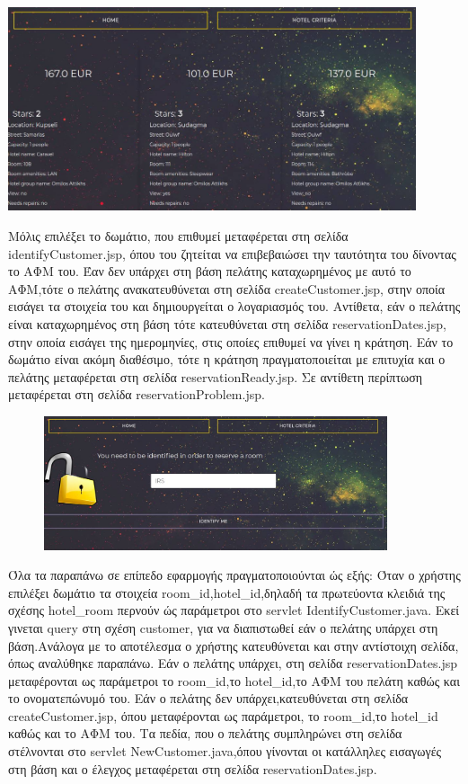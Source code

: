 \documentclass[a4paper,oneside, 11pt]{article}
\begin{document}
\begin{enumerate}
\includegraphics[width=0.9\textwidth]{roomSel.jpg}
\bigbreak


Μόλις επιλέξει το δωμάτιο, που επιθυμεί  μεταφέρεται στη σελίδα identifyCustomer.jsp, όπου του ζητείται να επιβεβαιώσει την ταυτότητα του δίνοντας το ΑΦΜ του. Έαν δεν υπάρχει στη βάση πελάτης καταχωρημένος με αυτό το ΑΦΜ,τότε ο πελάτης ανακατευθύνεται στη σελίδα createCustomer.jsp, στην οποία εισάγει τα στοιχεία του και δημιουργείται ο λογαριασμός του. Αντίθετα, εάν ο πελάτης είναι καταχωρημένος στη βάση τότε κατευθύνεται στη σελίδα reservationDates.jsp, στην οποία εισάγει της ημερομηνίες, στις οποίες επιθυμεί να γίνει η κράτηση. Εάν το δωμάτιο είναι ακόμη διαθέσιμο, τότε η κράτηση πραγματοποιείται με επιτυχία και ο πελάτης μεταφέρεται στη σελίδα reservationReady.jsp. Σε αντίθετη περίπτωση μεταφέρεται στη σελίδα reservationProblem.jsp.
\begin{figure}[h]
\center
\includegraphics[width=0.9\textwidth]{identify.jpg}
\bigbreak
\end{figure}



Όλα τα παραπάνω σε επίπεδο εφαρμογής πραγματοποιούνται ώς εξής: Όταν ο χρήστης επιλέξει δωμάτιο τα στοιχεία room\_id,hotel\_id,δηλαδή τα πρωτεύοντα κλειδιά της σχέσης hotel\_room περνούν ώς παράμετροι στο servlet IdentifyCustomer.java. Εκεί γινεται query στη σχέση customer, για να διαπιστωθεί εάν ο πελάτης υπάρχει στη βάση.Ανάλογα με το αποτέλεσμα ο χρήστης κατευθύνεται και στην αντίστοιχη σελίδα, όπως αναλύθηκε παραπάνω. Εάν ο πελάτης υπάρχει, στη σελίδα reservationDates.jsp μεταφέρονται ως παράμετροι το room\_id,το hotel\_id,το ΑΦΜ του πελάτη καθώς και το ονοματεπώνυμό του. Εάν ο πελάτης δεν υπάρχει,κατευθύνεται στη σελίδα createCustomer.jsp, όπου μεταφέρονται ως παράμετροι, το room\_id,το hotel\_id καθώς και το ΑΦΜ του. Τα πεδία, που ο πελάτης συμπληρώνει στη σελίδα στέλνονται στο servlet NewCustomer.java,όπου γίνονται οι κατάλληλες εισαγωγές στη βάση και ο έλεγχος μεταφέρεται στη σελίδα reservationDates.jsp.


\end{enumerate}
\end{document}
